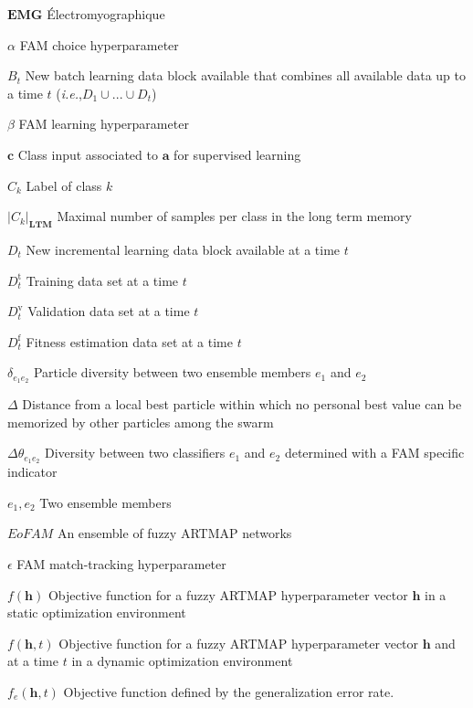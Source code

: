 \documentclass[letterpaper, twoside, 12pt, memoire, creativecommons, hyperref]{thETS}
\begin{document}
\begin{listofsymbols}[3cm]
\item [$\textbf{EMG}$] Électromyographique
\item [$\alpha$] FAM choice hyperparameter
\item [$B_t$] New batch learning data block available that combines all available data up to a time $t$ (\emph{i.e.},$D_1 \cup ... \cup D_t$)
\item [$\beta$] FAM learning hyperparameter
\item [$\mathbf{c}$] Class input associated to $\textbf{a}$ for supervised learning
\item [$C_k$] Label of class $k$
\item [$|C_k|_\mathbf{LTM}$] Maximal number of samples per class in the long term memory
\item [$D_t$] New incremental learning data block available at a time $t$
\item [$D_t^\text{t}$] Training data set at a time $t$
\item [$D_t^\text{v}$] Validation data set at a time $t$
\item [$D_t^\text{f}$] Fitness estimation data set at a time $t$
\item [$\delta_{e_1e_2}$] Particle diversity between two ensemble members $e_1$ and $e_2$
\item [$\Delta$] Distance from a local best particle within which no personal best value can be memorized by other particles among the swarm
\item [$\Delta\theta_{e_1e_2}$] Diversity between two classifiers $e_1$ and $e_2$ determined with a FAM specific indicator
\item [$e_1,e_2$] Two ensemble members
\item [$\textit{EoFAM}$] An ensemble of fuzzy ARTMAP networks
\item [$\epsilon$] FAM match-tracking hyperparameter
\item [$f(\textbf{h})$] Objective function for a fuzzy ARTMAP hyperparameter vector $\textbf{h}$ in a static optimization environment
\item [$f(\textbf{h},t)$] Objective function for a fuzzy ARTMAP hyperparameter vector $\textbf{h}$ and at a time $t$ in a dynamic optimization environment
\item [$f_e(\mathbf{h},t)$] Objective function defined by the generalization error rate.

\end{listofsymbols}
\end{document}
